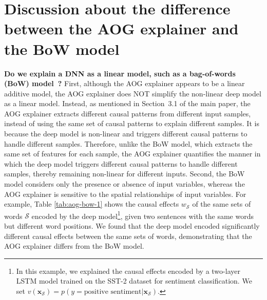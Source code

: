\section{Discussion about the difference between the AOG explainer and the BoW model}

\textbf{Do we explain a DNN as a linear model, such as a bag-of-words (BoW) model~\cite{sivic2003video,csurka2004visual}?}
First, although the AOG explainer appears to be a linear additive model, the AOG explainer does NOT simplify the non-linear deep model as a linear model.
Instead, as mentioned in Section~3.1 of the main paper, the AOG explainer extracts different causal patterns from different input samples, instead of using the same set of causal patterns to explain different samples.
It is because the deep model is non-linear and triggers different causal patterns to handle different samples.
Therefore, unlike the BoW model, which extracts the same set of features for each sample, the AOG explainer quantifies the manner in which the deep model triggers different causal patterns to handle different samples, thereby remaining non-linear for different inputs.
Second, the BoW model considers only the presence or absence of input variables, whereas the AOG explainer is sensitive to the spatial relationships of input variables.
For example, Table \ref{tab:aog-bow-1} shows the causal effects {\small$w_{\mathcal{S}}$} of the same sets of words {\small$\mathcal{S}$} encoded by the deep model\footnote{In this example, we explained the causal effects encoded by a two-layer LSTM model trained on the SST-2 dataset for sentiment classification. We set {\small$v(\boldsymbol{x}_{\mathcal{S}}) =p(y=\text{positive sentiment}|\boldsymbol{x}_{\mathcal{S}})$}.}, given two sentences with the same words but different word positions.
We found that the deep model encoded significantly different causal effects between the same sets of words, demonstrating that the AOG explainer differs from the BoW model.




